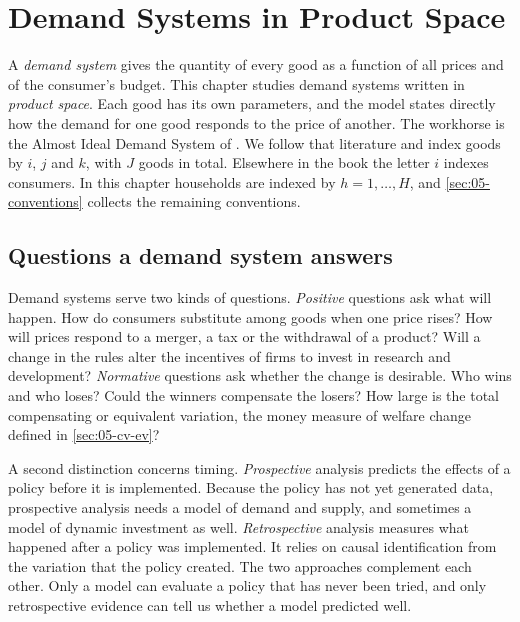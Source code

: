 
\section{Demand Systems in Product Space}\label{sec:05-productspace}

A \emph{demand system} gives the quantity of every good as a function of all prices and of the consumer's
budget. This chapter studies demand systems written in \emph{product space}. Each good has its own
parameters, and the model states directly how the demand for one good responds to the price of another.
The workhorse is the Almost Ideal Demand System of \citet{DeatonMuellbauer1980a}. We follow that literature
and index goods by $i$, $j$ and $k$, with $J$ goods in total. Elsewhere in the book the letter $i$ indexes
consumers. In this chapter households are indexed by $h = 1, \dots, H$, and \cref{sec:05-conventions}
collects the remaining conventions.

\subsection{Questions a demand system answers}\label{sec:05-questions}

Demand systems serve two kinds of questions. \emph{Positive} questions ask what will happen. How do
consumers substitute among goods when one price rises? How will prices respond to a merger, a tax or the
withdrawal of a product? Will a change in the rules alter the incentives of firms to invest in research and
development? \emph{Normative} questions ask whether the change is desirable. Who wins and who loses? Could
the winners compensate the losers? How large is the total compensating or equivalent variation, the money
measure of welfare change defined in \cref{sec:05-cv-ev}?

A second distinction concerns timing. \emph{Prospective} analysis predicts the effects of a policy before it
is implemented. Because the policy has not yet generated data, prospective analysis needs a model of demand
and supply, and sometimes a model of dynamic investment as well. \emph{Retrospective} analysis measures what
happened after a policy was implemented. It relies on causal identification from the variation that the
policy created. The two approaches complement each other. Only a model can evaluate a policy that has never
been tried, and only retrospective evidence can tell us whether a model predicted well.

